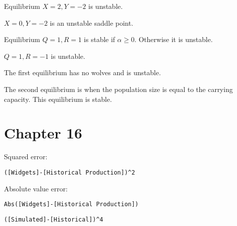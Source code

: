 \documentclass[]{memoir}
\begin{document}

Equilibrium $X=2, Y=-2$ is unstable.

$X=0, Y=-2$ is an unstable saddle point.


Equilibrium $Q=1, R=1$ is stable if $\alpha \geq 0$. Otherwise it is
unstable.

$Q=1, R=-1$ is unstable.


The first equilibrium has no wolves and is unstable.

The second equilibrium is when the population size is equal to the
carrying capacity. This equilibrium is stable.

\section{Chapter 16}


Squared error:

\lstinline!([Widgets]-[Historical Production])^2!

Absolute value error:

\lstinline!Abs([Widgets]-[Historical Production])!


\lstinline!([Simulated]-[Historical])^4!
\end{document}
